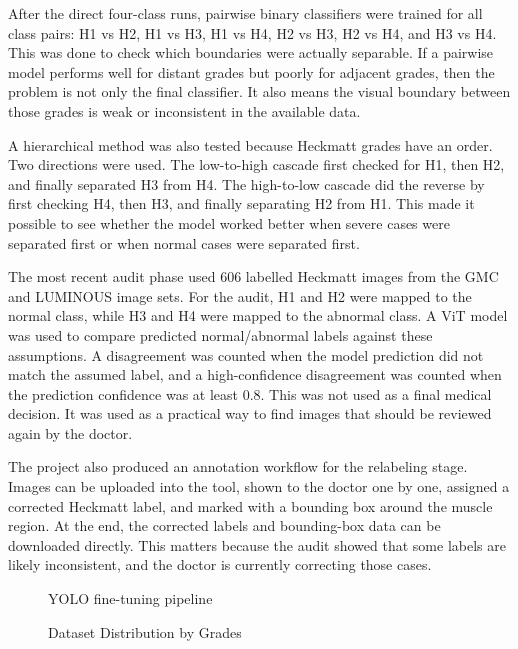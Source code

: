 After the direct four-class runs, pairwise binary classifiers were trained for all class pairs: H1 vs H2, H1 vs H3, H1 vs H4, H2 vs H3, H2 vs H4, and H3 vs H4. This was done to check which boundaries were actually separable. If a pairwise model performs well for distant grades but poorly for adjacent grades, then the problem is not only the final classifier. It also means the visual boundary between those grades is weak or inconsistent in the available data.

A hierarchical method was also tested because Heckmatt grades have an order. Two directions were used. The low-to-high cascade first checked for H1, then H2, and finally separated H3 from H4. The high-to-low cascade did the reverse by first checking H4, then H3, and finally separating H2 from H1. This made it possible to see whether the model worked better when severe cases were separated first or when normal cases were separated first.

The most recent audit phase used 606 labelled Heckmatt images from the GMC and LUMINOUS image sets. For the audit, H1 and H2 were mapped to the normal class, while H3 and H4 were mapped to the abnormal class. A ViT model was used to compare predicted normal/abnormal labels against these assumptions. A disagreement was counted when the model prediction did not match the assumed label, and a high-confidence disagreement was counted when the prediction confidence was at least 0.8. This was not used as a final medical decision. It was used as a practical way to find images that should be reviewed again by the doctor.

The project also produced an annotation workflow for the relabeling stage. Images can be uploaded into the tool, shown to the doctor one by one, assigned a corrected Heckmatt label, and marked with a bounding box around the muscle region. At the end, the corrected labels and bounding-box data can be downloaded directly. This matters because the audit showed that some labels are likely inconsistent, and the doctor is currently correcting those cases.


\begin{figure}[H]
\centering
{}
\caption{YOLO fine-tuning pipeline}
\label{fig:yolo_finetune}
\end{figure}

\clearpage

\begin{figure}[H]
\centering
{}
\caption{Dataset Distribution by Grades}
\label{fig:dataset_distribution}
\end{figure}



